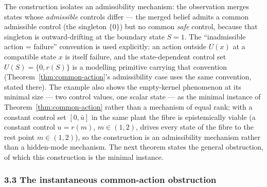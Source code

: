 \documentclass[11pt]{article}
\theoremstyle{definition}
\begin{document}
The construction isolates an admissibility mechanism: the observation merges states whose \emph{admissible}
controls differ --- the merged belief admits a common admissible control
(the singleton \(\{0\}\)) but no common \emph{safe} control, because
that singleton is outward-drifting at the boundary state \(S = 1\). The
``inadmissible action = failure'' convention is used explicitly: an action outside \(U(x)\) at a compatible state \(x\) is
itself failure, and the state-dependent control set
\(U(S) = \{0, r(S)\}\) is a modelling primitive carrying that convention
(Theorem~\ref{thm:common-action}'s admissibility case uses the same convention, stated there).
The example also shows the empty-kernel phenomenon at its minimal size
--- two control values, one scalar state --- as the minimal instance of
Theorem~\ref{thm:common-action} rather than a mechanism of equal rank; with a constant control
set \([0, \bar u]\) in the same plant the fibre is epistemically viable
(a constant control \(u = r(m)\), \(m \in (1,2)\), drives every state of
the fibre to the rest point \(m \in (1,2)\)), so the construction is an admissibility mechanism rather than a hidden-mode mechanism. The next
theorem states the general obstruction, of which this construction is
the minimal instance.

\subsubsection{3.3 The instantaneous common-action
obstruction}\label{the-instantaneous-common-action-obstruction}
\end{document}
